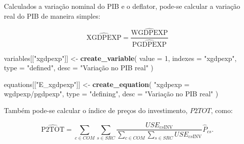 \documentclass[12pt,twoside]{article}
\newenvironment{Shaded}{\begin{snugshade}}{\end{snugshade}}
\newcommand{\DataTypeTok}[1]{\textcolor[rgb]{0.13,0.29,0.53}{#1}}
\newcommand{\DecValTok}[1]{\textcolor[rgb]{0.00,0.00,0.81}{#1}}
\newcommand{\KeywordTok}[1]{\textcolor[rgb]{0.13,0.29,0.53}{\textbf{#1}}}
\newcommand{\NormalTok}[1]{#1}
\newcommand{\StringTok}[1]{\textcolor[rgb]{0.31,0.60,0.02}{#1}}
\let\oldShaded\Shaded
\let\endoldShaded\endShaded
\renewenvironment{Shaded}{\footnotesize\oldShaded}{\endoldShaded}
\begin{document}
Calculados a variação nominal do PIB e o deflator, pode-se calcular a
variação real do PIB de maneira simples:

\[\hat{\text{XGDPEXP}} = \frac{\hat{\text{WGDPEXP}}}{\hat{\text{PGDPEXP}}}\]

\begin{Shaded}
\begin{Highlighting}[]
\NormalTok{variables[[}\StringTok{"xgdpexp"}\NormalTok{]] <-}\StringTok{ }\KeywordTok{create_variable}\NormalTok{(}
  \DataTypeTok{value =} \DecValTok{1}\NormalTok{,}
  \DataTypeTok{indexes =} \StringTok{"xgdpexp"}\NormalTok{,}
  \DataTypeTok{type =} \StringTok{"defined"}\NormalTok{,}
  \DataTypeTok{desc =} \StringTok{"Variação no PIB real"}
\NormalTok{)}

\NormalTok{equations[[}\StringTok{"E_xgdpexp"}\NormalTok{]] <-}\StringTok{ }\KeywordTok{create_equation}\NormalTok{(}
  \StringTok{"xgdpexp = wgdpexp/pgdpexp"}\NormalTok{,}
  \DataTypeTok{type =} \StringTok{"defining"}\NormalTok{,}
  \DataTypeTok{desc =} \StringTok{"Variação no PIB real"}
\NormalTok{)}
\end{Highlighting}
\end{Shaded}

Também pode-se calcular o índice de preços do investimento, \(P2TOT\),
como:

\[\hat{\text{P2TOT}} = \sum_{c\in COM}\sum_{s\in SRC}\frac{USE_{cs\text{INV}}}{\sum_{c\in COM}\sum_{s\in SRC}USE_{cs\text{INV}}}\hat{P}_{cs}.\]
\end{document}
